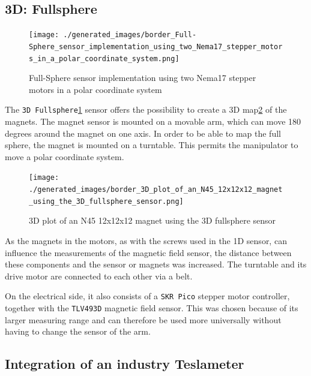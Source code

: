 \hypertarget{d-fullsphere}{%
\subsection{3D: Fullsphere}\label{d-fullsphere}}

\begin{figure}
\centering
\texttt{[image: ./generated\_images/border\_Full-Sphere\_sensor\_implementation\_using\_two\_Nema17\_stepper\_motors\_in\_a\_polar\_coordinate\_system.png]}
\caption{Full-Sphere sensor implementation using two Nema17 stepper
motors in a polar coordinate system
\label{Full-Sphere_sensor_implementation_using_two_Nema17_stepper_motors_in_a_polar_coordinate_system.png}}
\end{figure}

The
\passthrough{\lstinline!3D Fullsphere!}\ref{Full-Sphere_sensor_implementation_using_two_Nema17_stepper_motors_in_a_polar_coordinate_system.png}
sensor offers the possibility to create a 3D
map\ref{3D_plot_of_an_N45_12x12x12_magnet_using_the_3D_fullsphere_sensor.png}
of the magnets. The magnet sensor is mounted on a movable arm, which can
move 180 degrees around the magnet on one axis. In order to be able to
map the full sphere, the magnet is mounted on a turntable. This permits
the manipulator to move a polar coordinate system.

\begin{figure}
\centering
\texttt{[image: ./generated\_images/border\_3D\_plot\_of\_an\_N45\_12x12x12\_magnet\_using\_the\_3D\_fullsphere\_sensor.png]}
\caption{3D plot of an N45 12x12x12 magnet using the 3D fullsphere
sensor
\label{3D_plot_of_an_N45_12x12x12_magnet_using_the_3D_fullsphere_sensor.png}}
\end{figure}

As the magnets in the motors, as with the screws used in the 1D sensor,
can influence the measurements of the magnetic field sensor, the
distance between these components and the sensor or magnets was
increased. The turntable and its drive motor are connected to each other
via a belt.

On the electrical side, it also consists of a
\passthrough{\lstinline!SKR Pico!} stepper motor controller, together
with the \passthrough{\lstinline!TLV493D!} magnetic field sensor. This
was chosen because of its larger measuring range and can therefore be
used more universally without having to change the sensor of the arm.

\hypertarget{integration-of-an-industry-teslameter}{%
\subsection{Integration of an industry
Teslameter}\label{integration-of-an-industry-teslameter}}

